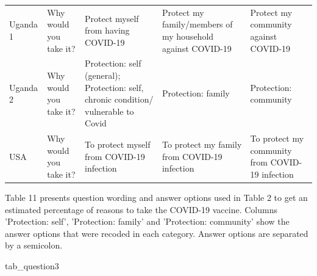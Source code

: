 \documentclass[
  12pt,
]{article}
\newenvironment{Shaded}{\begin{snugshade}}{\end{snugshade}}
\newcommand{\NormalTok}[1]{#1}
\begin{document}
\begin{table}[!h]
{\begin{threeparttable}
\begin{tabular}[t]{>{\raggedright\arraybackslash}p{8em}>{\raggedright\arraybackslash}p{8em}>{\raggedright\arraybackslash}p{10em}>{\raggedright\arraybackslash}p{10em}>{\raggedright\arraybackslash}p{10em}}
Uganda 1 & Why would you take it? & Protect myself from having COVID-19 & Protect my family/members of my household against COVID-19 & Protect my community against COVID-19\\
Uganda 2 & Why would you take it? & Protection: self (general); Protection: self, chronic condition/ vulnerable to Covid & Protection: family & Protection: community\\
USA & Why would you take it? & To protect myself from COVID-19 infection & To protect my family from COVID-19 infection & To protect my community from COVID-19 infection\\
\bottomrule
\end{tabular}
\begin{tablenotes}
\item Table 11 presents question wording and answer options used in Table 2 to get an estimated percentage of reasons to take the COVID-19 vaccine. Columns 'Protection: self', 'Protection: family' and  'Protection: community' show the answer options that were recoded in each category. Answer options are separated by a semicolon.
\end{tablenotes}
\end{threeparttable}}
\end{table}

\begin{Shaded}
\begin{Highlighting}[]
\NormalTok{tab\_question3}
\end{Highlighting}
\end{Shaded}
\end{document}
